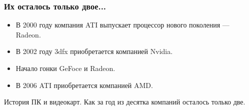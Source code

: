 \documentclass[10pt]{beamer}
\begin{document}
\begin{frame}\frametitle{Их осталось только двое...}
{
	{
	}
	{
		\begin{itemize}
			\item В 2000 году компания ATI выпускает процессор нового поколения — Radeon.
			\item В 2002 году 3dfx приобретается компанией Nvidia.
			\item Начало гонки GeFoce и Radeon.
			\item В 2006 ATI приобретается компанией AMD.
		\end{itemize}
		
	}
	
	\hfill
	
	\scriptsize
	{История ПК и видеокарт. Как за год из десятка компаний осталось только две.}
	
	
}\end{frame}




	
\end{document}
